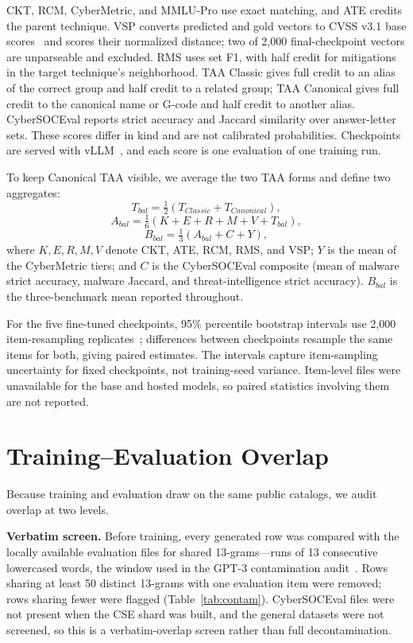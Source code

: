 \documentclass[conference]{IEEEtran}
\begin{document}
CKT, RCM, CyberMetric, and MMLU-Pro use exact matching, and ATE credits the parent technique. VSP converts predicted and gold vectors to CVSS v3.1 base scores~\cite{first2019cvss} and scores their normalized distance; two of 2,000 final-checkpoint vectors are unparseable and excluded. RMS uses set F1, with half credit for mitigations in the target technique's neighborhood. TAA Classic gives full credit to an alias of the correct group and half credit to a related group; TAA Canonical gives full credit to the canonical name or G-code and half credit to another alias. CyberSOCEval reports strict accuracy and Jaccard similarity over answer-letter sets. These scores differ in kind and are not calibrated probabilities. Checkpoints are served with vLLM~\cite{kwon2023vllm}, and each score is one evaluation of one training run.

To keep Canonical TAA visible, we average the two TAA forms and define two aggregates:
\begin{equation}
T_{bal}=\tfrac{1}{2}(T_{Classic}+T_{Canonical}),
\end{equation}
\begin{equation}
A_{bal}=\tfrac{1}{6}(K+E+R+M+V+T_{bal}),
\end{equation}
\begin{equation}
B_{bal}=\tfrac{1}{3}(A_{bal}+C+Y),
\end{equation}
where $K,E,R,M,V$ denote CKT, ATE, RCM, RMS, and VSP; $Y$ is the mean of the CyberMetric tiers; and $C$ is the CyberSOCEval composite (mean of malware strict accuracy, malware Jaccard, and threat-intelligence strict accuracy). $B_{bal}$ is the three-benchmark mean reported throughout.

For the five fine-tuned checkpoints, 95\% percentile bootstrap intervals use 2,000 item-resampling replicates~\cite{efron1993bootstrap}; differences between checkpoints resample the same items for both, giving paired estimates. The intervals capture item-sampling uncertainty for fixed checkpoints, not training-seed variance. Item-level files were unavailable for the base and hosted models, so paired statistics involving them are not reported.

\section{Training--Evaluation Overlap}\label{sec:overlap}
Because training and evaluation draw on the same public catalogs, we audit overlap at two levels.

\textbf{Verbatim screen.} Before training, every generated row was compared with the locally available evaluation files for shared 13-grams---runs of 13 consecutive lowercased words, the window used in the GPT-3 contamination audit~\cite{brown2020language}. Rows sharing at least 50 distinct 13-grams with one evaluation item were removed; rows sharing fewer were flagged (Table~\ref{tab:contam}). CyberSOCEval files were not present when the CSE shard was built, and the general datasets were not screened, so this is a verbatim-overlap screen rather than full decontamination.
\end{document}
